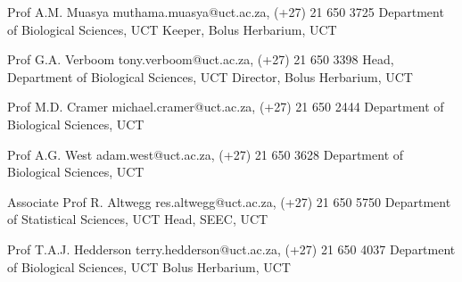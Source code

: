 \documentclass[10pt]{article}
\begin{document}
\begin{hangparas}{2em}{1}

Prof A.M. Muasya         \hfill muthama.muasya@uct.ac.za, (+27) 21 650 3725 \break
Department of Biological Sciences, UCT \break
Keeper, Bolus Herbarium, UCT

Prof G.A. Verboom
                           \hfill tony.verboom@uct.ac.za, (+27) 21 650 3398 \break
Head, Department of Biological Sciences, UCT \break
Director, Bolus Herbarium, UCT

Prof M.D. Cramer         \hfill michael.cramer@uct.ac.za, (+27) 21 650 2444 \break
Department of Biological Sciences, UCT

Prof A.G. West                \hfill adam.west@uct.ac.za, (+27) 21 650 3628 \break
Department of Biological Sciences, UCT

Associate Prof R. Altwegg   \hfill res.altwegg@uct.ac.za, (+27) 21 650 5750 \break
Department of Statistical Sciences, UCT \break
Head, SEEC, UCT

Prof T.A.J. Hedderson   \hfill terry.hedderson@uct.ac.za, (+27) 21 650 4037 \break
Department of Biological Sciences, UCT \break
Bolus Herbarium, UCT

\end{hangparas}
\end{document}
